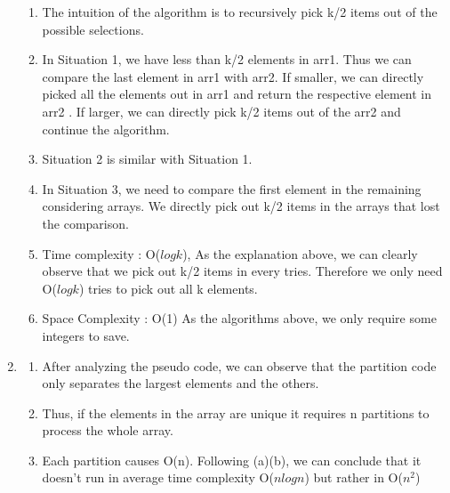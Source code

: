 \documentclass{article}
\begin{document}
\begin{CJK*}{UTF8}{bsmi}
\begin{enumerate}
\begin{enumerate}
    \item The intuition of the algorithm is to recursively pick k/2 items out of the possible selections.
    \item In Situation 1, we have less than k/2 elements in arr1. Thus we can compare the last element in arr1 with arr2. If smaller, we can directly picked all the elements out in arr1 and return the respective element in arr2 . If larger, we can directly pick k/2 items out of the arr2 and continue the algorithm.
    \item Situation 2 is similar with Situation 1.
    \item In Situation 3, we need to compare the first element in the remaining considering arrays. We directly pick out k/2 items in the arrays that lost the comparison.
    \item Time complexity : O($log{k}$), As the explanation above, we can clearly observe that we pick out k/2 items in every tries. Therefore we only need O($log{k}$) tries to pick out all k elements.
    \item Space Complexity : O(1) As the algorithms above, we only require some integers to save.
    \end{enumerate}
    \item \begin{enumerate}
        \item After analyzing the pseudo code, we can observe that the partition code only separates the largest elements and the others.
        \item Thus, if the elements in the array are unique it requires n partitions to process the whole array.
        \item Each partition causes O(n). Following (a)(b), we can conclude that it doesn't run in average time complexity O($nlog{n}$) but rather in O($n^2$)
    \end{enumerate} 
     
    
\end{enumerate}


\end{CJK*}
\end{document}

